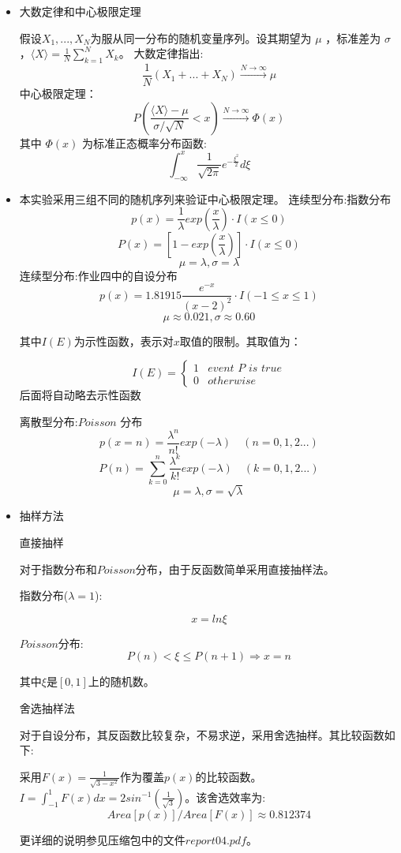 \documentclass[UTF8]{ctexart}
\begin{document}
	\begin{itemize}
		
		
		\item 大数定律和中心极限定理
	
		假设$X_1,...,X_N$为服从同一分布的随机变量序列。设其期望为 $\mu$ ，标准差为 $\sigma$，$ \langle X \rangle=\frac{1}{N}\sum_{k=1}^{N}X_k$。
		大数定律指出:
		$$\frac{1}{N}\left(X_1+...+X_N\right)\stackrel{N\rightarrow\infty}{\longrightarrow}\mu$$
		中心极限定理：
		$$P\left(\frac{\langle X \rangle-\mu}{\sigma/\sqrt{N}}<x\right)\stackrel{N\rightarrow\infty}{\longrightarrow}\Phi(x)$$
		其中 $\Phi(x)$ 为标准正态概率分布函数:$$\int_{-\infty}^{x}\frac{1}{\sqrt{2\pi}}e^{-\frac{\xi^2}{2}}d\xi$$
		
		\item 本实验采用三组不同的随机序列来验证中心极限定理。
		\subitem 连续型分布:指数分布
		$$p(x)=\frac{1}{\lambda}exp\left({\frac{x}{\lambda}}\right)\cdot I(x\leq0)$$
		$$P(x)=[1-exp\left({\frac{x}{\lambda}}\right)]\cdot I(x\leq0)$$
		$$\mu=\lambda,\sigma=\lambda$$
		\subitem 连续型分布:作业四中的自设分布
		$$p(x)=1.81915\frac{e^{-x}}{{(x-2)^2}}\cdot I(-1\leq x\leq1)$$
		$$\mu\approx0.021,\sigma\approx0.60$$
		
		其中$I(E)$为示性函数，表示对$x$取值的限制。其取值为：

$$I(E)=\left\{
\begin{array}{ll}
1&event\,\,P\,\,is\,\,true\\
0& otherwise
\end{array}
\right.$$
后面将自动略去示性函数

	\subitem 离散型分布:$Poisson$ 分布
	$$p(x=n)=\frac{\lambda^n}{n!}exp(-\lambda)\quad(n=0,1,2...)$$
	$$P(n)=\sum_{k=0}^{n}\frac{\lambda^k}{k!}exp(-\lambda)\quad(k=0,1,2...)$$
	$$\mu=\lambda,\sigma=\sqrt{\lambda}$$
	
\item 抽样方法

\subitem 直接抽样

对于指数分布和$Poisson$分布，由于反函数简单采用直接抽样法。

指数分布($\lambda=1$):

				$$x=ln\xi$$


$Poisson$分布:
		$$P(n)<\xi\leq P(n+1)\Rightarrow x=n$$
		
	其中$\xi$是$[0,1]$上的随机数。

\subitem 舍选抽样法

对于自设分布，其反函数比较复杂，不易求逆，采用舍选抽样。其比较函数如下:

采用$F(x)=\frac{1}{\sqrt{3-x^2}}$作为覆盖$p(x)$的比较函数。$I=\int_{-1}^{1}F(x)dx=2sin^{-1}(\frac{1}{\sqrt{3}})$。该舍选效率为:
$$Area[p(x)]/Area[F(x)]\approx0.812374$$

更详细的说明参见压缩包中的文件$report04.pdf$。

	\end{itemize}
\end{document}
